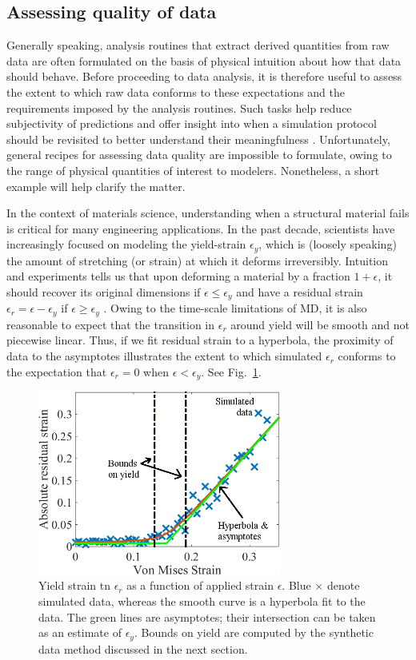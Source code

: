 \subsection{Assessing quality of data}
Generally speaking, analysis routines that extract derived quantities from raw data are often formulated on the basis of physical intuition about how that data should behave.  Before proceeding to data analysis, it is therefore useful to assess the extent to which raw data conforms to these expectations and the requirements imposed by the analysis routines.  Such tasks help reduce subjectivity of predictions and offer insight into when a simulation protocol should be revisited to better understand their meaningfulness \cite{patrone1}.  Unfortunately, general recipes for assessing data quality are impossible to formulate, owing to the range of physical quantities of interest to modelers.  Nonetheless, a short example will help clarify the matter.

In the context of materials science, understanding when a structural material fails is critical for many engineering applications.  In the past decade, scientists have increasingly focused on modeling the yield-strain $\epsilon_y$, which is (loosely speaking) the amount of stretching (or strain) at which it deforms irreversibly.  Intuition and experiments tells us that upon deforming a material by a fraction $1+\epsilon$, it should recover its original dimensions if $\epsilon \le \epsilon_y$ and have a residual strain $\epsilon_r = \epsilon - \epsilon_y$ if $\epsilon \ge \epsilon_y$ \cite{patrone2}.  Owing to the time-scale limitations of MD, it is also reasonable to expect that the transition in $\epsilon_r$ around yield will be smooth and not piecewise linear.  Thus, if we fit residual strain to a hyperbola, the proximity of data to the asymptotes illustrates the extent to which simulated $\epsilon_r$ conforms to the expectation that $\epsilon_r=0$ when $\epsilon < \epsilon_y$.  See Fig.~\ref{fig:yield}.

\begin{figure}
\includegraphics[width=8cm]{hyperbola.png}\caption{Yield strain tn $\epsilon_r$ as a function of applied strain $\epsilon$.  Blue $\times$ denote simulated data, whereas the smooth curve is a hyperbola fit to the data.  The green lines are asymptotes; their intersection can be taken as an estimate of $\epsilon_y$.    Bounds on yield are computed by the synthetic data method discussed in the next section.}\label{fig:yield}
\end{figure}

